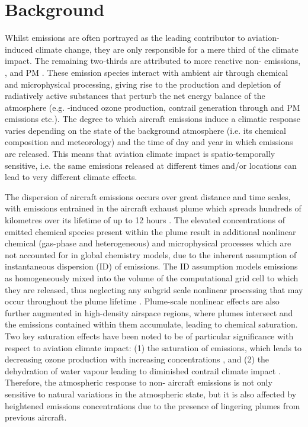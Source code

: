 \section{Background}
Whilst  emissions are often portrayed as the leading contributor to aviation-induced climate change, they are only responsible for a mere third of the climate impact. The remaining two-thirds are attributed to more reactive non- emissions, ,  and PM \cite{Lee2021}. These emission species interact with ambient air through chemical and microphysical processing, giving rise to the production and depletion of radiatively active substances that perturb the net energy balance of the atmosphere (e.g. -induced ozone production, contrail generation through  and PM emissions etc.). The degree to which aircraft emissions induce a climatic response varies depending on the state of the background atmosphere (i.e. its chemical composition and meteorology) and the time of day and year in which emissions are released. This means that aviation climate impact is spatio-temporally sensitive, i.e. the same emissions released at different times and/or locations can lead to very different climate effects. 

The dispersion of aircraft emissions occurs over great distance and time scales, with emissions entrained in the aircraft exhaust plume which spreads hundreds of kilometres over its lifetime of up to 12 hours \cite{Kraabol2000a, EPA1992}. The elevated concentrations of emitted chemical species present within the plume result in additional nonlinear chemical (gas-phase and heterogeneous) and microphysical processes which are not accounted for in global chemistry models, due to the inherent assumption of instantaneous dispersion (ID) of emissions. The ID assumption models emissions as homogeneously mixed into the volume of the computational grid cell to which they are released, thus neglecting any subgrid scale nonlinear processing that may occur throughout the plume lifetime \cite{Paoli2011}. Plume-scale nonlinear effects are also further augmented in high-density airspace regions, where plumes intersect and the emissions contained within them accumulate, leading to chemical saturation. Two key saturation effects have been noted to be of particular significance with respect to aviation climate impact: (1) the saturation of  emissions, which leads to decreasing ozone production with increasing  concentrations \cite{Jaegle1999}, and (2) the dehydration of water vapour leading to diminished contrail climate impact \cite{Schumann2015}. Therefore, the atmospheric response to non- aircraft emissions is not only sensitive to natural variations in the atmospheric state, but it is also affected by heightened emissions concentrations due to the presence of lingering plumes from previous aircraft.

